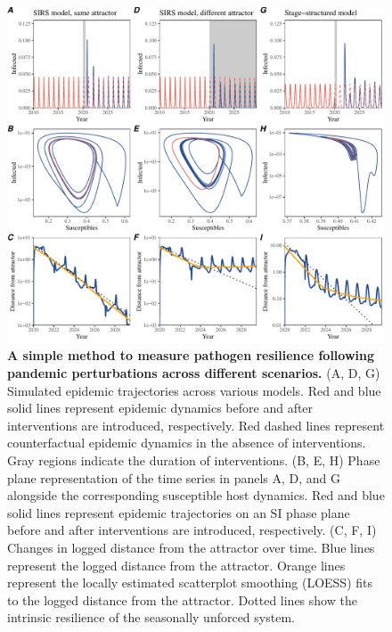 \documentclass[12pt]{article}
\begin{document}
\begin{figure}[!th]
\includegraphics[width=\textwidth]{../figure2/figure2_simple.pdf}
\caption{
\textbf{A simple method to measure pathogen resilience following pandemic perturbations across different scenarios.}
(A, D, G) Simulated epidemic trajectories across various models. 
Red and blue solid lines represent epidemic dynamics before and after interventions are introduced, respectively.
Red dashed lines represent counterfactual epidemic dynamics in the absence of interventions.
Gray regions indicate the duration of interventions.
(B, E, H) Phase plane representation of the time series in panels A, D, and G alongside the corresponding susceptible host dynamics.
Red and blue solid lines represent epidemic trajectories on an SI phase plane before and after interventions are introduced, respectively.
(C, F, I) Changes in logged distance from the attractor over time.
Blue lines represent the logged distance from the attractor.
Orange lines represent the locally estimated scatterplot smoothing (LOESS) fits to the logged distance from the attractor.
Dotted lines show the intrinsic resilience of the seasonally unforced system.
}
\end{figure}
\end{document}
